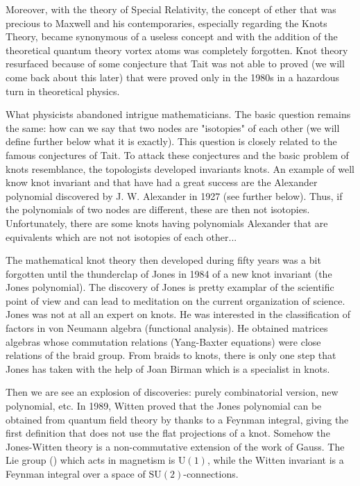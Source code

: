 {	Moreover, with the theory of Special Relativity, the concept of ether that was precious to Maxwell and his contemporaries, especially regarding the Knots Theory, became synonymous of a useless concept and with the addition of the theoretical quantum theory vortex atoms was completely forgotten. Knot theory resurfaced because of some conjecture that Tait was not able to proved (we will come back about this later) that were proved only in the 1980s in a hazardous turn in theoretical physics.
	
	What physicists abandoned intrigue mathematicians. The basic question remains the same: how can we say that two nodes are "isotopies" of each other (we will define further below what it is exactly). This question is closely related to the famous conjectures of Tait. To attack these conjectures and the basic problem of knots resemblance, the topologists developed invariants knots. An example of well know knot invariant and that have had  a great success are the Alexander polynomial discovered by J. W. Alexander in 1927 (see further below). Thus, if the polynomials of two nodes are different, these are then not isotopies. Unfortunately, there are some knots having polynomials Alexander that are equivalents which are not not isotopies of each other...
	
	The mathematical knot theory then developed during fifty years was a bit forgotten until the thunderclap of Jones in 1984 of a new knot invariant (the Jones polynomial). The discovery of Jones is pretty examplar of the scientific point of view and can lead to meditation on the current organization of science. Jones was not at all an expert on knots. He was interested in the classification of factors in von Neumann algebra (functional analysis). He obtained matrices algebras whose commutation relations (Yang-Baxter equations) were close relations of the braid group. From braids to knots, there is only one step that Jones has taken with the help of Joan Birman which is a specialist in knots.
	
	Then we are see an explosion of discoveries: purely combinatorial version, new polynomial, etc. In 1989, Witten proved that the Jones polynomial can be obtained from quantum field theory by thanks to a Feynman integral, giving the first definition that does not use the flat projections of a knot. Somehow the Jones-Witten theory is a non-commutative extension of the work of Gauss. The Lie group () which acts in magnetism is $\text{U}(1)$, while the Witten invariant is a Feynman integral over a space of $\text{SU}(2)$-connections.
	
}
